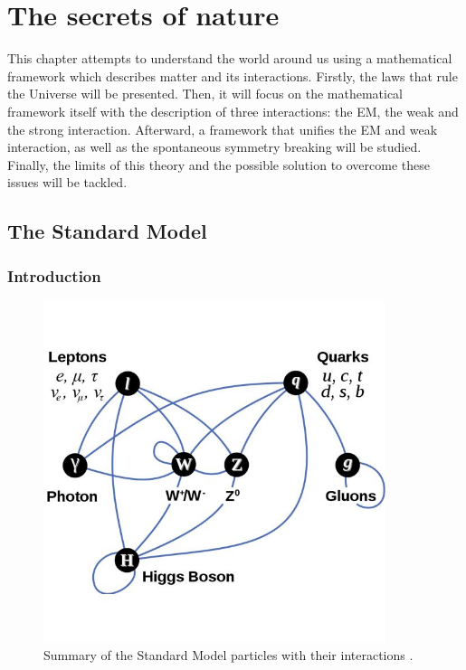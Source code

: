 \chapter{The secrets of nature}
\label{chap:SM}

  This chapter attempts to understand the world around us using a mathematical framework which describes matter and its interactions.
  Firstly, the laws that rule the Universe will be presented.
  Then, it will focus on the mathematical framework itself with the description of three interactions: the \gls{EM}, the weak and the strong interaction.
  Afterward, a framework that unifies the \gls{EM} and weak interaction, as well as the spontaneous symmetry breaking will be studied.
  Finally, the limits of this theory and the possible solution to overcome these issues will be tackled.
 
  \minitoc
  
  \section{The Standard Model}

    \subsection{Introduction}
     
    \begin{figure}[!h]
    \centering
      \includegraphics[width = 10cm]{Pictures/SM/elementaryParticles.jpg}
    \caption{Summary of the Standard Model particles with their interactions \cite{SM}.}
    \label{fig:partInterac}
    \end{figure}   
    

